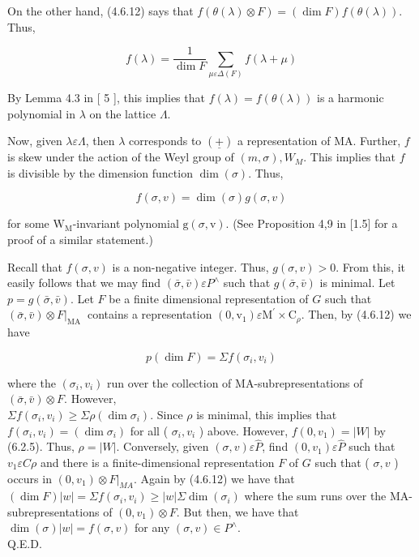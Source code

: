 \documentclass[10pt]{article}
\begin{document}
On the other hand, (4.6.12) says that $f(\theta(\lambda) \otimes F)=(\operatorname{dim} F) f(\theta(\lambda))$. Thus,


\begin{equation*}
f(\lambda)=\frac{1}{\operatorname{dim} F} \sum_{\mu \varepsilon \Delta(F)} f(\lambda+\mu) \tag{6.4.4}
\end{equation*}


By Lemma 4.3 in [ 5 ], this implies that $f(\lambda)=f(\theta(\lambda))$ is a harmonic polynomial in $\lambda$ on the lattice $\Lambda$.

Now, given $\lambda \varepsilon \Lambda$, then $\lambda$ corresponds to $(\underline{+})$ a representation of MA. Further, $f$ is skew under the action of the Weyl group of $(m, \sigma), W_{M}$. This implies that $f$ is divisible by the dimension function $\operatorname{dim}(\sigma)$. Thus,


\begin{equation*}
f(\sigma, v)=\operatorname{dim}(\sigma) g(\sigma, v) \tag{6.4.5}
\end{equation*}


for some $\mathrm{W}_{\mathrm{M}}$-invariant polynomial $\mathrm{g}(\sigma, \mathrm{v})$. (See Proposition 4,9 in [1.5] for a proof of a similar statement.)

Recall that $f(\sigma, v)$ is a non-negative integer. Thus, $g(\sigma, v)>0$. From this, it easily follows that we may find $(\bar{\sigma}, \bar{v}) \varepsilon P^{\wedge}$ such that $g(\bar{\sigma}, \bar{v})$ is minimal. Let $p=g(\bar{\sigma}, \bar{v})$. Let $F$ be a finite dimensional representation of $G$ such that $\left.(\bar{\sigma}, \bar{v}) \otimes F\right|_{\text {MA }}$ contains a representation $\left(0, \mathrm{v}_{1}\right) \varepsilon \mathrm{M}^{\prime} \times \mathrm{C}_{\rho}$. Then, by (4.6.12) we have


\begin{equation*}
p(\operatorname{dim} F)=\Sigma f\left(\sigma_{i}, v_{i}\right) \tag{6.4.6}
\end{equation*}


where the $\left(\sigma_{i}, v_{i}\right)$ run over the collection of MA-subrepresentations of $(\bar{\sigma}, \bar{v}) \otimes F$. However,\\
$\Sigma f\left(\sigma_{i}, v_{i}\right) \geq \Sigma \rho\left(\operatorname{dim} \sigma_{i}\right)$. Since $\rho$ is minimal, this implies that $f\left(\sigma_{i}, v_{i}\right)=\left(\operatorname{dim} \sigma_{i}\right)$ for all ( $\sigma_{i}, v_{i}$ ) above. However, $f\left(0, v_{1}\right)=|W|$ by (6.2.5). Thus, $\rho=|W|$. Conversely, given $(\sigma, v) \varepsilon \hat{P}$, find $\left(0, v_{1}\right) \varepsilon \hat{P}$ such that $v_{1} \varepsilon C \rho$ and there is a finite-dimensional representation $F$ of $G$ such that ( $\sigma, v$ ) occurs in $\left.\left(0, v_{1}\right) \otimes F\right|_{M A}$. Again by (4.6.12) we have that $(\operatorname{dim} F)|w|=\Sigma f\left(\sigma_{i}, v_{i}\right) \geq|w| \Sigma \operatorname{dim}\left(\sigma_{i}\right)$ where the sum runs over the MA-subrepresentations of $\left(0, v_{1}\right) \otimes F$. But then, we have that $\operatorname{dim}(\sigma)|w|=f(\sigma, v)$ for any $(\sigma, v) \in P^{\wedge}$.\\
Q.E.D.
\end{document}
